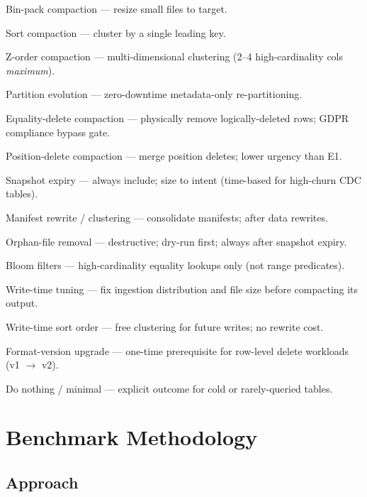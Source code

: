 \documentclass[11pt,a4paper]{article}
\begin{document}
\begin{description}[leftmargin=2.5em,labelwidth=2em]
  \item[A]  Bin-pack compaction --- resize small files to target.
  \item[B]  Sort compaction --- cluster by a single leading key.
  \item[C]  Z-order compaction --- multi-dimensional clustering (2--4 high-cardinality cols \emph{maximum}).
  \item[D]  Partition evolution --- zero-downtime metadata-only re-partitioning.
  \item[E1] Equality-delete compaction --- physically remove logically-deleted rows; GDPR compliance bypass gate.
  \item[E2] Position-delete compaction --- merge position deletes; lower urgency than E1.
  \item[F]  Snapshot expiry --- always include; size to intent (time-based for high-churn CDC tables).
  \item[G]  Manifest rewrite / clustering --- consolidate manifests; after data rewrites.
  \item[H]  Orphan-file removal --- destructive; dry-run first; always after snapshot expiry.
  \item[I]  Bloom filters --- high-cardinality equality lookups only (not range predicates).
  \item[J]  Write-time tuning --- fix ingestion distribution and file size before compacting its output.
  \item[K]  Write-time sort order --- free clustering for future writes; no rewrite cost.
  \item[L]  Format-version upgrade --- one-time prerequisite for row-level delete workloads (v1 $\to$ v2).
  \item[Z]  Do nothing / minimal --- explicit outcome for cold or rarely-queried tables.
\end{description}

\section{Benchmark Methodology}
\label{sec:methodology}

\subsection{Approach}
\end{document}
